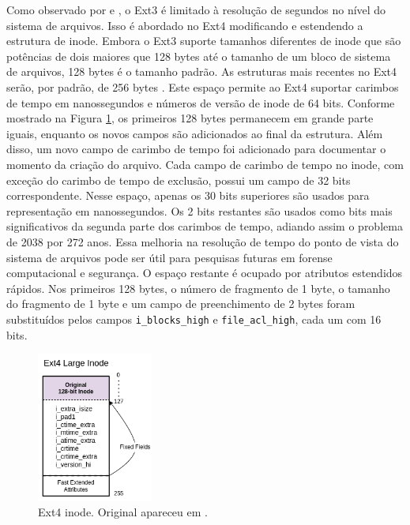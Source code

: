 \documentclass[
	12pt,				%
	openright,			%
	oneside,			%
	a4paper,			%
	chapter=TITLE,		%
	english,			%
	french,				%
	spanish,			%
	brazil				%
	]{abntex2}
\theoremstyle{definition}
\begin{document}
Como observado por \cite{matur} e \cite{xia}, o Ext3 é limitado à resolução de segundos 
no nível do sistema de arquivos. Isso é abordado no Ext4 modificando e estendendo a estrutura de 
inode. Embora o Ext3 suporte tamanhos diferentes de inode que são potências de dois maiores que 128 
bytes até o tamanho de um bloco de sistema de arquivos, 128 bytes é o tamanho padrão. As estruturas 
mais recentes no Ext4 serão, por padrão, de 256 bytes \cite{matur}. Este espaço permite ao 
Ext4 suportar carimbos de tempo em nanossegundos e números de versão de inode de 64 bits. 
Conforme mostrado na Figura \ref{fig:ext4-inode}, os primeiros 128 bytes permanecem em 
grande parte iguais, enquanto os novos campos são adicionados ao final da estrutura. 
Além disso, um novo campo de carimbo de tempo foi adicionado para documentar o momento 
da criação do arquivo. Cada campo de carimbo de tempo no inode, com exceção do carimbo de tempo de 
exclusão, possui um campo de 32 bits correspondente. Nesse espaço, apenas os 30 bits superiores são 
usados para representação em nanossegundos. Os 2 bits restantes são usados como bits mais significativos 
da segunda parte dos carimbos de tempo, adiando assim o problema de 2038 por 272 anos. 
Essa melhoria na resolução de tempo do ponto de vista do sistema de arquivos pode ser 
útil para pesquisas futuras em forense computacional e segurança. O espaço restante é 
ocupado por atributos estendidos rápidos. Nos primeiros 128 bytes, o número de fragmento 
de 1 byte, o tamanho do fragmento de 1 byte e um campo de preenchimento de 2 bytes foram 
substituídos pelos campos \texttt{i\_blocks\_high} e \texttt{file\_acl\_high}, cada um com 16 bits.

\begin{figure}[H]
  \centering
  \includegraphics[width=0.34\textwidth]{fig12.png}
  \caption{Ext4 inode. Original apareceu em \cite{matur}.}
  \label{fig:ext4-inode}
\end{figure}
\end{document}
